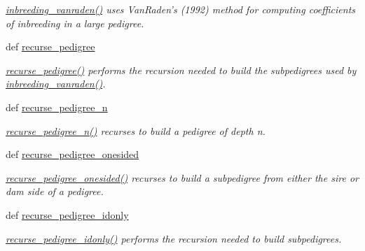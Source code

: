 \begin{CompactItemize}
\begin{CompactList}\small\item\em \hyperlink{namespacePyPedal_1_1pyp__nrm_577fd15845cca08988029a7ccf7f68e4}{inbreeding\_\-vanraden()} uses Van\-Raden's (1992) method for computing coefficients of inbreeding in a large pedigree. \item\end{CompactList}\item 
def \hyperlink{namespacePyPedal_1_1pyp__nrm_c2e0cc42e37f47162f7844645ebf21e1}{recurse\_\-pedigree}
\begin{CompactList}\small\item\em \hyperlink{namespacePyPedal_1_1pyp__nrm_c2e0cc42e37f47162f7844645ebf21e1}{recurse\_\-pedigree()} performs the recursion needed to build the subpedigrees used by \hyperlink{namespacePyPedal_1_1pyp__nrm_577fd15845cca08988029a7ccf7f68e4}{inbreeding\_\-vanraden()}. \item\end{CompactList}\item 
def \hyperlink{namespacePyPedal_1_1pyp__nrm_9fe4e7e546ef28461188a080d971cdf7}{recurse\_\-pedigree\_\-n}
\begin{CompactList}\small\item\em \hyperlink{namespacePyPedal_1_1pyp__nrm_9fe4e7e546ef28461188a080d971cdf7}{recurse\_\-pedigree\_\-n()} recurses to build a pedigree of depth n. \item\end{CompactList}\item 
def \hyperlink{namespacePyPedal_1_1pyp__nrm_71cc351a78e2a8f9b528a5e696efecc2}{recurse\_\-pedigree\_\-onesided}
\begin{CompactList}\small\item\em \hyperlink{namespacePyPedal_1_1pyp__nrm_71cc351a78e2a8f9b528a5e696efecc2}{recurse\_\-pedigree\_\-onesided()} recurses to build a subpedigree from either the sire or dam side of a pedigree. \item\end{CompactList}\item 
def \hyperlink{namespacePyPedal_1_1pyp__nrm_0497f483c9c840213e97cff287417c71}{recurse\_\-pedigree\_\-idonly}
\begin{CompactList}\small\item\em \hyperlink{namespacePyPedal_1_1pyp__nrm_0497f483c9c840213e97cff287417c71}{recurse\_\-pedigree\_\-idonly()} performs the recursion needed to build subpedigrees. \item\end{CompactList}\item 

\end{CompactItemize}
